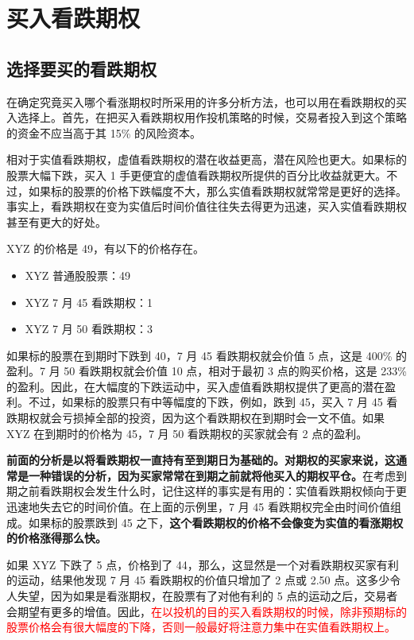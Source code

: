 \chapter{买入看跌期权}
\section{选择要买的看跌期权}
在确定究竟买入哪个看涨期权时所采用的许多分析方法，也可以用在看跌期权的买入选择上。首先，在把买入看跌期权用作投机策略的时候，交易者投入到这个策略的资金不应当高于其 15\% 的风险资本。

相对于实值看跌期权，虚值看跌期权的潜在收益更高，潜在风险也更大。如果标的股票大幅下跌，买入 1 手更便宜的虚值看跌期权所提供的百分比收益就更大。不过，如果标的股票的价格下跌幅度不大，那么实值看跌期权就常常是更好的选择。事实上，看跌期权在变为实值后时间价值往往失去得更为迅速，买入实值看跌期权甚至有更大的好处。

\begin{tcolorbox}
    XYZ 的价格是 49，有以下的价格存在。
    \begin{itemize}
        \item XYZ 普通股股票：49
        \item XYZ 7 月 45 看跌期权：1
        \item XYZ 7 月 50 看跌期权：3
    \end{itemize}

    如果标的股票在到期时下跌到 40，7 月 45 看跌期权就会价值 5 点，这是 400\% 的盈利。7 月 50 看跌期权就会价值 10 点，相对于最初 3 点的购买价格，这是 233\% 的盈利。因此，在大幅度的下跌运动中，买入虚值看跌期权提供了更高的潜在盈利。不过，如果标的股票只有中等幅度的下跌，例如，跌到 45，买入 7 月 45 看跌期权就会亏损掉全部的投资，因为这个看跌期权在到期时会一文不值。如果 XYZ 在到期时的价格为 45，7 月 50 看跌期权的买家就会有 2 点的盈利。

    \textbf{前面的分析是以将看跌期权一直持有至到期日为基础的。对期权的买家来说，这通常是一种错误的分析，因为买家常常在到期之前就将他买入的期权平仓。}在考虑到期之前看跌期权会发生什么时，记住这样的事实是有用的：实值看跌期权倾向于更迅速地失去它的时间价值。在上面的示例里，7 月 45 看跌期权完全由时间价值组成。如果标的股票跌到 45 之下，\textbf{这个看跌期权的价格不会像变为实值的看涨期权的价格涨得那么快。}
\end{tcolorbox}

如果 XYZ 下跌了 5 点，价格到了 44，那么，这显然是一个对看跌期权买家有利的运动，结果他发现 7 月 45 看跌期权的价值只增加了 2 点或 2.50 点。这多少令人失望，因为如果是看涨期权，在股票有了对他有利的 5 点的运动之后，交易者会期望有更多的增值。因此，\textcolor{red}{在以投机的目的买入看跌期权的时候，除非预期标的股票价格会有很大幅度的下降，否则一般最好将注意力集中在实值看跌期权上。}

